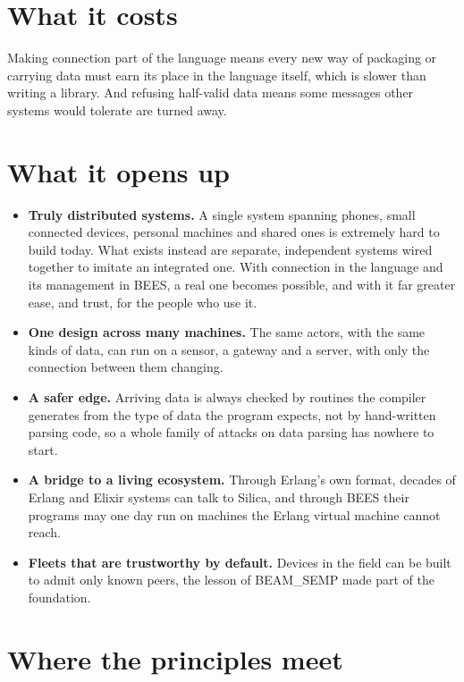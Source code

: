\section{What it costs}

Making connection part of the language means every new way of packaging or
carrying data must earn its place in the language itself, which is slower than
writing a library. And refusing half-valid data means some messages other
systems would tolerate are turned away.

\section{What it opens up}

\begin{itemize}
  \item \textbf{Truly distributed systems.} A single system spanning phones,
        small connected devices, personal machines and shared ones is extremely
        hard to build today. What exists instead are separate, independent
        systems wired together to imitate an integrated one. With connection in
        the language and its management in BEES, a real one becomes possible,
        and with it far greater ease, and trust, for the people who use it.
  \item \textbf{One design across many machines.} The same actors, with the
        same kinds of data, can run on a sensor, a gateway and a server, with
        only the connection between them changing.
  \item \textbf{A safer edge.} Arriving data is always checked by routines
        the compiler generates from the type of data the program expects,
        not by hand-written parsing code, so a whole family of attacks on
        data parsing has nowhere to start.
  \item \textbf{A bridge to a living ecosystem.} Through Erlang's own format,
        decades of Erlang and Elixir systems can talk to Silica, and through
        BEES their programs may one day run on machines the Erlang virtual
        machine cannot reach.
  \item \textbf{Fleets that are trustworthy by default.} Devices in the field
        can be built to admit only known peers, the lesson of BEAM\_SEMP made
        part of the foundation.
\end{itemize}

\section{Where the principles meet}


